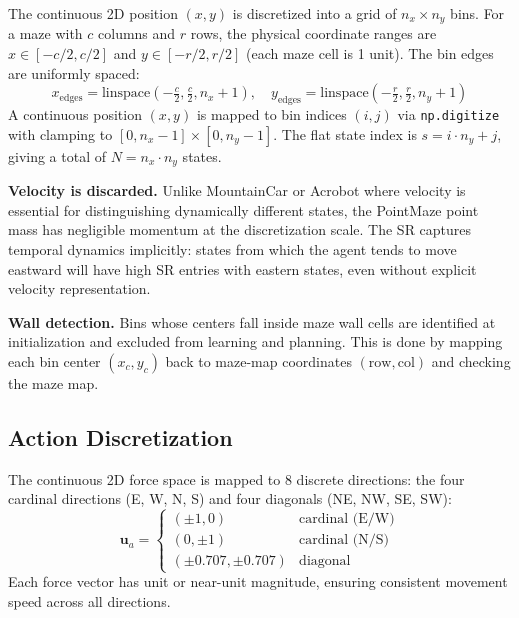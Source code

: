 \documentclass[11pt,a4paper]{article}
\begin{document}
The continuous 2D position $(x, y)$ is discretized into a grid of $n_x \times n_y$ bins.
For a maze with $c$ columns and $r$ rows, the physical coordinate ranges are $x \in [-c/2, c/2]$ and $y \in [-r/2, r/2]$ (each maze cell is 1 unit).
The bin edges are uniformly spaced:
\begin{equation}
    x_{\text{edges}} = \text{linspace}\!\left(-\tfrac{c}{2}, \tfrac{c}{2}, n_x + 1\right), \quad
    y_{\text{edges}} = \text{linspace}\!\left(-\tfrac{r}{2}, \tfrac{r}{2}, n_y + 1\right)
\end{equation}
A continuous position $(x, y)$ is mapped to bin indices $(i, j)$ via \texttt{np.digitize} with clamping to $[0, n_x{-}1] \times [0, n_y{-}1]$.
The flat state index is $s = i \cdot n_y + j$, giving a total of $N = n_x \cdot n_y$ states.

\textbf{Velocity is discarded.}
Unlike MountainCar or Acrobot where velocity is essential for distinguishing dynamically different states, the PointMaze point mass has negligible momentum at the discretization scale.
The SR captures temporal dynamics implicitly: states from which the agent tends to move eastward will have high SR entries with eastern states, even without explicit velocity representation.

\textbf{Wall detection.}
Bins whose centers fall inside maze wall cells are identified at initialization and excluded from learning and planning.
This is done by mapping each bin center $(x_c, y_c)$ back to maze-map coordinates $(\text{row}, \text{col})$ and checking the maze map.

\subsection{Action Discretization}
\label{sec:actions}

The continuous 2D force space is mapped to 8 discrete directions: the four cardinal directions (E, W, N, S) and four diagonals (NE, NW, SE, SW):
\begin{equation}
    \mathbf{u}_a = \begin{cases}
        (\pm 1, 0) & \text{cardinal (E/W)} \\
        (0, \pm 1) & \text{cardinal (N/S)} \\
        (\pm 0.707, \pm 0.707) & \text{diagonal}
    \end{cases}
\end{equation}
Each force vector has unit or near-unit magnitude, ensuring consistent movement speed across all directions.
\end{document}
